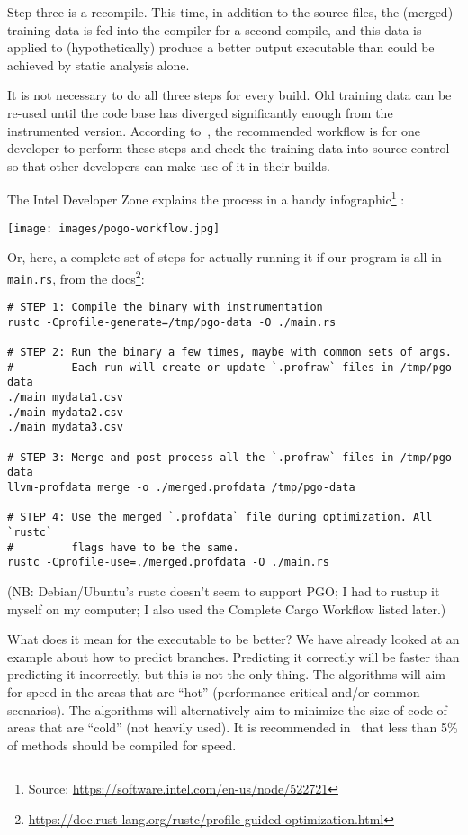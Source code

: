 Step three is a recompile. This time, in addition to the source files, the (merged) training data is fed into the compiler for a second compile, and this data is applied to (hypothetically) produce a better output executable than could be achieved by static analysis alone.


It is not necessary to do all three steps for every build. Old training data can be re-used until the code base has diverged significantly enough from the instrumented version. According to~\cite{pogo}, the recommended workflow is for one developer to perform these steps and check the training data into source control so that other developers can make use of it in their builds.

The Intel Developer Zone explains the process in a handy infographic\footnote{Source: \url{https://software.intel.com/en-us/node/522721}} :

\begin{center}
	\texttt{[image: images/pogo-workflow.jpg]}
\end{center}



Or, here, a complete set of steps for actually running it if our program is all in \texttt{main.rs}, from the docs\footnote{\url{https://doc.rust-lang.org/rustc/profile-guided-optimization.html}}:

{\scriptsize
\begin{verbatim}
# STEP 1: Compile the binary with instrumentation
rustc -Cprofile-generate=/tmp/pgo-data -O ./main.rs

# STEP 2: Run the binary a few times, maybe with common sets of args.
#         Each run will create or update `.profraw` files in /tmp/pgo-data
./main mydata1.csv
./main mydata2.csv
./main mydata3.csv

# STEP 3: Merge and post-process all the `.profraw` files in /tmp/pgo-data
llvm-profdata merge -o ./merged.profdata /tmp/pgo-data

# STEP 4: Use the merged `.profdata` file during optimization. All `rustc`
#         flags have to be the same.
rustc -Cprofile-use=./merged.profdata -O ./main.rs
\end{verbatim}
}
(NB: Debian/Ubuntu's rustc doesn't seem to support PGO; I had to rustup it myself on my computer; I also used the Complete Cargo Workflow listed later.)

What does it mean for the executable to be better? We have already looked at an example about how to predict branches. Predicting it correctly will be faster than predicting it incorrectly, but this is not the only thing.  The algorithms will aim for speed in the areas that are ``hot'' (performance critical and/or common scenarios). The algorithms will alternatively aim to minimize the size of code of areas that are ``cold'' (not heavily used). It is recommended in~\cite{pogo} that less than 5\% of methods should be compiled for speed.

